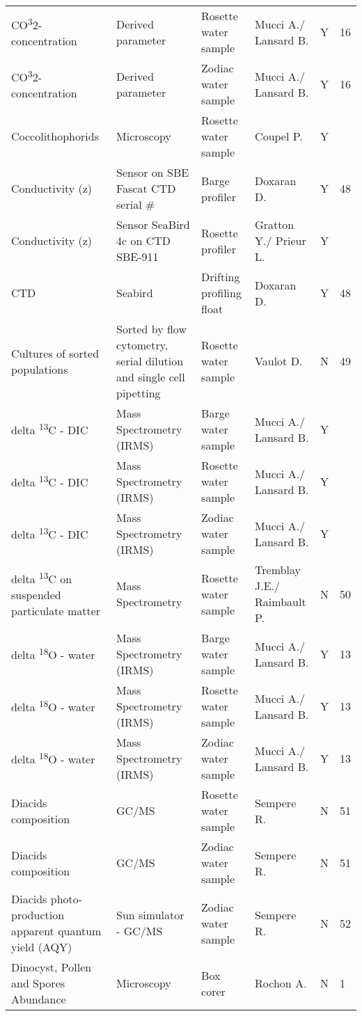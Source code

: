 \begin{ThreePartTable}
\begin{longtable}[t]{llllll}
CO\textsuperscript{3}2- concentration & Derived parameter & Rosette water sample & Mucci A./ Lansard B. & Y & 16\\
CO\textsuperscript{3}2- concentration & Derived parameter & Zodiac water sample & Mucci A./ Lansard B. & Y & 16\\
\addlinespace
Coccolithophorids & Microscopy & Rosette water sample & Coupel P. & Y & \\
Conductivity (z) & Sensor on SBE Fascat CTD serial \# & Barge profiler & Doxaran D. & Y & 48\\
Conductivity (z) & Sensor SeaBird 4c on CTD SBE-911 & Rosette profiler & Gratton Y./ Prieur L. & Y & \\
CTD & Seabird & Drifting profiling float & Doxaran D. & Y & 48\\
Cultures of sorted populations & Sorted by flow cytometry, serial dilution and single cell pipetting & Rosette water sample & Vaulot D. & N & 49\\
\addlinespace
delta \textsuperscript{13}C - DIC & Mass Spectrometry (IRMS) & Barge water sample & Mucci A./ Lansard B. & Y & \\
delta \textsuperscript{13}C - DIC & Mass Spectrometry (IRMS) & Rosette water sample & Mucci A./ Lansard B. & Y & \\
delta \textsuperscript{13}C - DIC & Mass Spectrometry (IRMS) & Zodiac water sample & Mucci A./ Lansard B. & Y & \\
delta \textsuperscript{13}C on suspended particulate matter & Mass Spectrometry & Rosette water sample & Tremblay J.E./ Raimbault P. & N & 50\\
delta \textsuperscript{18}O - water & Mass Spectrometry (IRMS) & Barge water sample & Mucci A./ Lansard B. & Y & 13\\
\addlinespace
delta \textsuperscript{18}O - water & Mass Spectrometry (IRMS) & Rosette water sample & Mucci A./ Lansard B. & Y & 13\\
delta \textsuperscript{18}O - water & Mass Spectrometry (IRMS) & Zodiac water sample & Mucci A./ Lansard B. & Y & 13\\
Diacids composition & GC/MS & Rosette water sample & Sempere R. & N & 51\\
Diacids composition & GC/MS & Zodiac water sample & Sempere R. & N & 51\\
Diacids photo-production apparent quantum yield (AQY) & Sun simulator - GC/MS & Zodiac water sample & Sempere R. & N & 52\\
\addlinespace
Dinocyst, Pollen and Spores Abundance & Microscopy & Box corer & Rochon A. & N & 1\\

\end{longtable}
\end{ThreePartTable}
